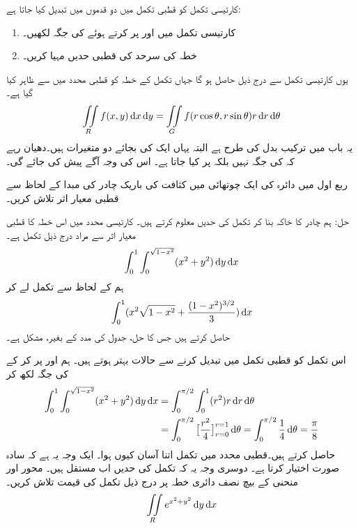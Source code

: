 کارتیسی تکمل  کو قطبی تکمل میں  دو قدموں میں تبدیل کیا جاتا ہے:
\begin{enumerate}[1.]
\item
کارتیسی تکمل میں   اور  پر کرتے ہوئے   کی جگہ  لکھیں۔
\item
خطہ  کی سرحد کی قطبی حدیں مہیا کریں۔
\end{enumerate}
 
یوں کارتیسی تکمل سے درج ذیل حاصل ہو گا جہاں تکمل کے خطہ کو قطبی محدد میں  سے ظاہر کیا گیا ہے۔
\begin{align}
\iint\limits_R f(x,y)\dif x\dif y=\iint\limits_G f(r\cos\theta,r\sin\theta)r\dif r\dif \theta
\end{align}
یہ  باب  میں ترکیب بدل کی طرح ہے البتہ یہاں ایک کی بجائے دو متغیرات ہیں۔دھیان رہے کہ  کی جگہ  نہیں بلکہ  پر کیا جاتا ہے۔ اس کی وجہ آگے پیش کی جائے گی۔

ربع اول میں دائرہ  کی ایک چوتھائی   میں کثافت  کی باریک چادر کی مبدا کے لحاظ سے  قطبی  معیار اثر تلاش کریں۔

حل:\quad
ہم چادر  کا خاکہ بنا کر تکمل کی حدیں معلوم کرتے ہیں۔ کارتیسی محدد میں اس خطہ  کا قطبی معیار اثر سے مراد درج ذیل تکمل ہے۔
\begin{align*}
\int_0^1\int_0^{\sqrt{1-x^2}}(x^2+y^2)\dif y\dif x
\end{align*}
ہم   کے لحاظ سے تکمل لے  کر
\begin{align*}
\int_0^1 (x^2\sqrt{1-x^2}+\frac{(1-x^2)^{3/2}}{3})\dif x
\end{align*}
حاصل کرتے ہیں جس کا حل، جدول کی مدد کے بغیر، مشکل ہے۔

 اس تکمل کو قطبی تکمل میں تبدیل کرنے  سے  حالات بہتر ہوتے ہیں۔ ہم  اور   پر کر کے  کی جگہ  لکھ کر
\begin{align*}
\int_0^1\int_0^{\sqrt{1-x^2}}(x^2+y^2)\dif y\dif x&=\int_0^{\pi/2}\int_0^{1} (r^2)r\dif r\dif \theta\\
&=\int_0^{\pi/2}\big[\frac{r^2}{4}\big]_{r=0}^{r=1}\dif\theta=\int_{0}^{\pi/2}\frac{1}{4}\dif\theta=\frac{\pi}{8}
\end{align*}
حاصل کرتے ہیں۔قطبی محدد میں تکمل اتنا آسان کیوں ہوا۔ ایک وجہ یہ ہے کہ   سادہ صورت  اختیار کرتا ہے۔ دوسری وجہ یہ کہ تکمل کی حدیں اب مستقل ہیں۔
محور  اور منحنی   کے بیچ نصف دائری خطہ  پر درج ذیل تکمل کی قیمت تلاش کریں۔
\begin{align*}
\iint\limits_R e^{x^2+y^2}\dif y\dif x
\end{align*}

